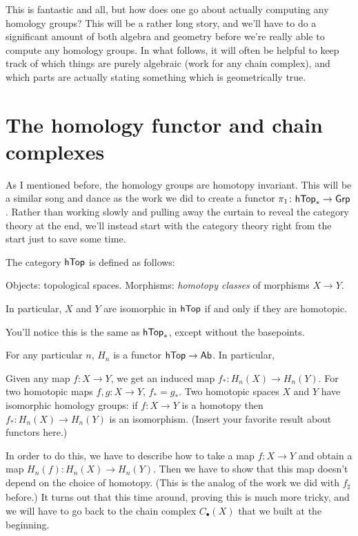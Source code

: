 This is fantastic and all, but how does one go about actually computing any homology groups?
This will be a rather long story, and we'll have to do a significant amount of both algebra and geometry
before we're really able to compute any homology groups.
In what follows, it will often be helpful to keep track of which things are purely algebraic
(work for any chain complex), and which parts are actually stating something which is geometrically true.

\section{The homology functor and chain complexes}
As I mentioned before, the homology groups are homotopy invariant.
This will be a similar song and dance as the work we did to
create a functor $\pi_1 \colon \mathsf{hTop}_\ast \to \mathsf{Grp}$.
Rather than working slowly and pulling away the curtain to reveal the category theory at the end,
we'll instead start with the category theory right from the start just to save some time.

\begin{definition}
	The category $\mathsf{hTop}$ is defined as follows:
	\begin{itemize}
		\ii Objects: topological spaces.
		\ii Morphisms: \emph{homotopy classes} of morphisms $X \to Y$.
	\end{itemize}
	In particular, $X$ and $Y$ are isomorphic in $\mathsf{hTop}$
	if and only if they are homotopic.
\end{definition}
You'll notice this is the same as $\mathsf{hTop}_\ast$,
except without the basepoints.

\begin{theorem}
	\label{thm:Hn_functor}
	For any particular $n$, $H_n$ is a functor $\mathsf{hTop} \to \mathsf{Ab}$.
	In particular,
	\begin{itemize}
		\ii Given any map $f \colon X \to Y$, we get an induced map $f_\ast \colon H_n(X) \to H_n(Y)$.
		\ii For two homotopic maps $f, g \colon X \to Y$, $f_\ast = g_\ast$.
		\ii Two homotopic spaces $X$ and $Y$ have isomorphic homology groups:
		if $f \colon X \to Y$ is a homotopy then $f_\ast \colon H_n(X) \to H_n(Y)$ is an isomorphism.
		\ii (Insert your favorite result about functors here.)
	\end{itemize}
\end{theorem}

In order to do this, we have to describe how to take a map $f \colon X \to Y$
and obtain a map $H_n(f) \colon H_n(X) \to H_n(Y)$.
Then we have to show that this map doesn't depend on the choice of homotopy.
(This is the analog of the work we did with $f_\sharp$ before.)
It turns out that this time around, proving this is much more tricky,
and we will have to go back to the chain complex
$C_\bullet(X)$ that we built at the beginning.


